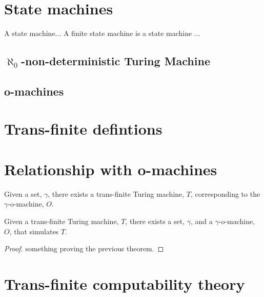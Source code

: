\documentclass[a4paper,openany]{amsart}
\begin{document}

\section{State machines}

\begin{definition}

A state machine... A finite state machine is a state machine ...

\end{definition}

\subsection{$\aleph_0$-non-deterministic Turing Machine}

\subsection{o-machines}

\section{Trans-finite defintions}

\section{Relationship with o-machines}

\begin{theorem}

Given a set, $\gamma$, there exists a trans-finite Turing machine, $T$, corresponding to
the $\gamma$-o-machine, $O$.

\end{theorem}


\begin{theorem}

Given a trans-finite Turing machine, $T$, there exists a set, $\gamma$, and a
$\gamma$-o-machine, $O$, that simulates $T$.

\end{theorem}

\begin{proof}
something proving the previous theorem.
\end{proof}

\section{Trans-finite computability theory}




\end{document}

